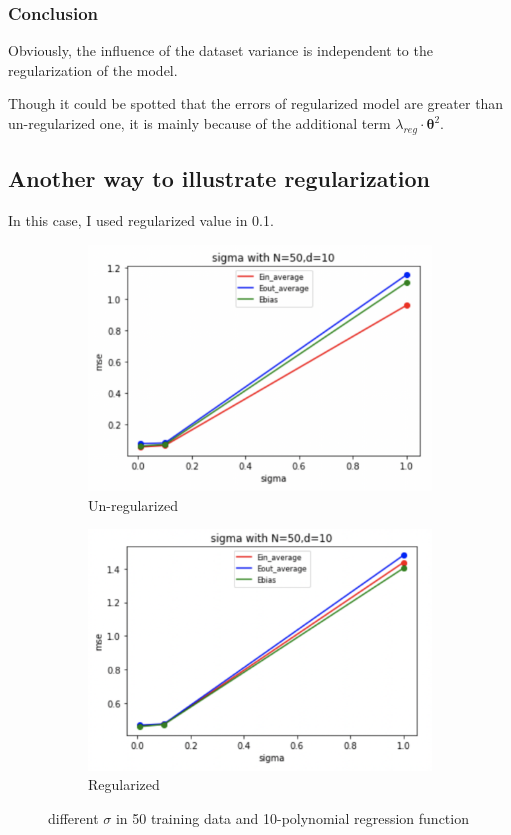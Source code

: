 \documentclass[12pt,letterpaper]{article}
\begin{document}
\subsubsection*{Conclusion}

Obviously, the influence of the dataset variance is independent to the regularization of the model.

Though it could be spotted that the errors of regularized model are greater than un-regularized one, it is mainly because of the additional term $\lambda_{reg} \cdot {\boldsymbol{ \theta} }^2$.

\subsection{Another way to illustrate regularization}

In this case, I used regularized value in 0.1. 

\begin{figure}[h]
\centering
\begin{subfigure}{.45\textwidth}
  \centering
  \includegraphics[width=.9\linewidth]{lzn50d10.png}
  \caption{\small Un-regularized}
  \label{fig:sub1}
\end{subfigure}
\begin{subfigure}{.45\textwidth}
  \centering
  \includegraphics[width=.9\linewidth]{lzn50d10reg.png}
  \caption{\small Regularized}
  \label{fig:sub2}
\end{subfigure}
\caption{\small different $\sigma$ in 50 training data and 10-polynomial regression function}
\label{fig:n50d10}
\end{figure}
\end{document}
